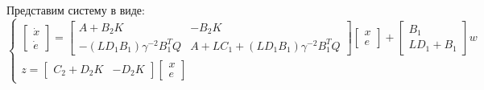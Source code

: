 Представим систему в виде:
\begin{equation}
    \begin{cases}
        \begin{bmatrix}
            \dot{x} \\ \dot{e}
        \end{bmatrix} =
        \begin{bmatrix}
            A + B_2K & -B_2K \\
            -(LD_1B_1)\gamma^{-2}B_1^TQ & A + LC_1 + (LD_1B_1)\gamma^{-2}B_1^TQ
        \end{bmatrix} \begin{bmatrix}
            x \\ e
        \end{bmatrix} +
        \begin{bmatrix}
            B_1 \\
            LD_1 + B_1
        \end{bmatrix}w \\
        z = \begin{bmatrix}
            C_2 +D_2K & -D_2K
        \end{bmatrix}\begin{bmatrix}
            x \\ e
        \end{bmatrix}
    \end{cases}
\end{equation}


